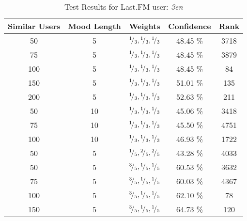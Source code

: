 \begin{table}[h!]
\centering
\begin{tabular}{ | c | c | c || c | c | }
\hline
Similar Users	& Mood Length	& Weights							&Confidence	&Rank\\
\hline \hline
50			& 5			& \({}^{1}\!/_{3}, {}^{1}\!/_{3}, {}^{1}\!/_{3}\)	&48.45 \%		&3718\\
\hline
75			& 5			& \({}^{1}\!/_{3}, {}^{1}\!/_{3}, {}^{1}\!/_{3}\)	&48.45 \%		&3879\\
\hline
100			& 5			& \({}^{1}\!/_{3}, {}^{1}\!/_{3}, {}^{1}\!/_{3}\)	&48.45 \%		&84\\
\hline
150			& 5			& \({}^{1}\!/_{3}, {}^{1}\!/_{3}, {}^{1}\!/_{3}\)	&51.01 \%		&135\\
\hline
200			& 5			& \({}^{1}\!/_{3}, {}^{1}\!/_{3}, {}^{1}\!/_{3}\)	&52.63 \%		&211\\
\hline
50			& 10			& \({}^{1}\!/_{3}, {}^{1}\!/_{3}, {}^{1}\!/_{3}\)	&45.06 \%		&3418\\
\hline
75			& 10			& \({}^{1}\!/_{3}, {}^{1}\!/_{3}, {}^{1}\!/_{3}\)	&45.50 \%		&4751\\
\hline
100			& 10			& \({}^{1}\!/_{3}, {}^{1}\!/_{3}, {}^{1}\!/_{3}\)	&46.93 \%		&1722\\
\hline
50			& 5			& \({}^{1}\!/_{5}, {}^{2}\!/_{5}, {}^{2}\!/_{5}\)	&43.28 \%		&4033\\
\hline
50			& 5			& \({}^{3}\!/_{5}, {}^{1}\!/_{5}, {}^{1}\!/_{5}\)	&60.53 \%		&3632\\
\hline
75			& 5			& \({}^{3}\!/_{5}, {}^{1}\!/_{5}, {}^{1}\!/_{5}\)	&60.03 \%		&4367\\
\hline
100			& 5			& \({}^{3}\!/_{5}, {}^{1}\!/_{5}, {}^{1}\!/_{5}\)	&62.10 \%		&78\\
\hline
150			& 5			& \({}^{3}\!/_{5}, {}^{1}\!/_{5}, {}^{1}\!/_{5}\)	&64.73 \%		&120\\
\hline
\end{tabular}
\caption{Test Results for Last.FM user: \emph{3en}}
\label{table:test_results_3en}
\end{table}

